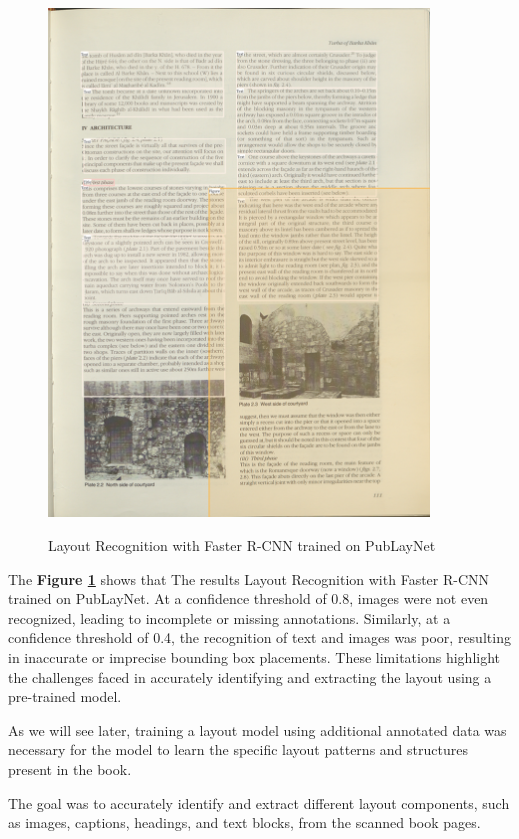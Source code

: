 \begin{figure}[H]
\begin{minipage}[c]{.45\linewidth}
        \includegraphics[width=0.9\textwidth]{Images/PLN8.png}
        \label{fig:Q41}
    \end{minipage}
    \caption{Layout Recognition with Faster R-CNN trained on PubLayNet}
    \label{fig:conf_comp}
\end{figure}

The \textbf{Figure \ref{fig:conf_comp}} shows that The results Layout Recognition with Faster R-CNN trained on PubLayNet. At a confidence threshold of 0.8, images were not even recognized, leading to incomplete or missing annotations. Similarly, at a confidence threshold of 0.4, the recognition of text and images was poor, resulting in inaccurate or imprecise bounding box placements. These limitations highlight the challenges faced in accurately identifying and extracting the layout using a pre-trained model.

As we will see later, training a layout model using additional annotated data was necessary for the model to learn the specific layout patterns and structures present in the book.

The goal was to accurately identify and extract different layout components, such as images, captions, headings, and text blocks, from the scanned book pages.

